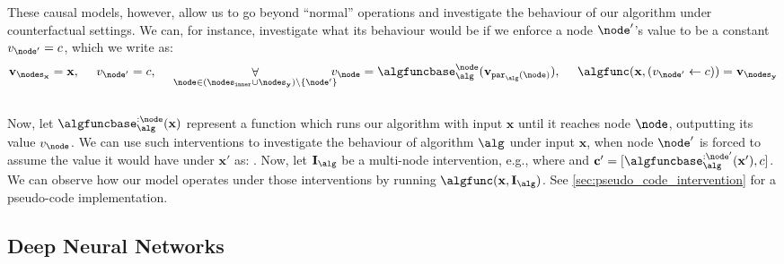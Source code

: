 \documentclass{article}
\newcommand{\bx}{\mathbf{x}}
\newcommand{\by}{\mathbf{y}}
\newcommand{\algfuncnode}[1]{\algfuncbase_{\alg}^{#1}}
\newcommand{\parents}{\mathtt{par}_{\alg}}
\newcommand{\nodevalue}{v}
\newcommand{\nodesvalues}{\mathbf{v}}
\newcommand{\nodesinput}{\nodes_{\bx}}
\newcommand{\nodesoutput}{\nodes_{\by}}
\newcommand{\nodesinner}{\nodes_{\mathtt{inner}}}
\begin{document}
\newcommand{\interventions}{\mathbf{I}}
\newcommand{\interventionsalg}{\interventions_{\alg}}
\newcommand{\interventionsdnn}{\interventions_{\dnn}}

These causal models, however, allow us to go beyond ``normal'' operations and investigate the behaviour of our algorithm under counterfactual settings.
We can, for instance, investigate what its behaviour would be if we enforce a node $\node'$'s
value to be a constant $\nodevalue_{\node'} = \constant$, which we write as:
\begin{align}
    \nodesvalues_{\nodesinput} = \bx, \quad\,\, 
    \nodevalue_{\node'} = \constant, \quad\,\, 
    \mathop{\forall}_{\node \in (\nodesinner\cup \nodesoutput)\setminus\{\node'\}}\!\!\!\!
    \nodevalue_{\node} = \algfuncnode{\node}(\nodesvalues_{\parents(\node)}), \quad\,\,
    \algfunc(\bx, (\nodevalue_{\node'} \leftarrow \constant)) = \nodesvalues_{\nodesoutput}
\end{align}\\[-5pt]
Now, let $\algfuncnode{:\node}(\bx)$ represent a function which runs our algorithm with input $\bx$ until it reaches node $\node$, outputting its value $\nodevalue_{\node}$.
We can use such interventions to investigate the behaviour of algorithm $\alg$ under input $\bx$, when node $\node'$ is forced to assume the value it would have under $\bx'$ as: \smash{$\algfunc(\bx, (\nodevalue_{\node'} \leftarrow \algfuncnode{:\node'}(\bx')))$}.
Now, let $\interventionsalg$ be a multi-node intervention, e.g., 
\smash{$\interventionsalg = (\nodesvalues_{\nodes'} \leftarrow \constants')$} where 
 and $\constants' = [\algfuncnode{:\node'}(\bx'), \constant]$.
We can observe how our model operates under those interventions by running $\algfunc(\bx, \interventionsalg)$. 
See \cref{sec:pseudo_code_intervention} for  a pseudo-code implementation.

\subsection{Deep Neural Networks}
\label{sec:dnn}
\end{document}
